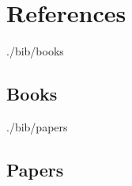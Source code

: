 
\clearpage
\chapter*{References}



\begin{btSect}[plain]{./bib/books}
 \section*{Books}
 \btPrintCited
\end{btSect}

\begin{btSect}[plain]{./bib/papers}
 \section*{Papers}
 \btPrintCited
\end{btSect}


\clearpage
{}



